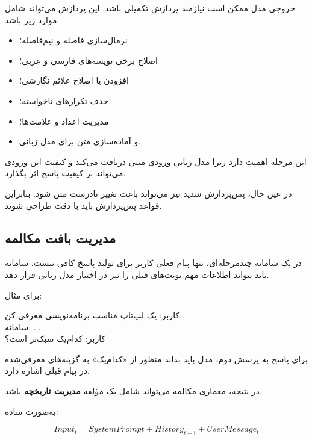 خروجی مدل  ممکن است نیازمند پردازش تکمیلی باشد.
این پردازش می‌تواند شامل موارد زیر باشد:

\begin{itemize}

    \item نرمال‌سازی فاصله و نیم‌فاصله؛

    \item اصلاح برخی نویسه‌های فارسی و عربی؛

    \item افزودن یا اصلاح علائم نگارشی؛

    \item حذف تکرارهای ناخواسته؛

    \item مدیریت اعداد و علامت‌ها؛

    \item و آماده‌سازی متن برای مدل زبانی.

\end{itemize}

این مرحله اهمیت دارد زیرا مدل زبانی ورودی متنی دریافت می‌کند و
کیفیت این ورودی می‌تواند بر کیفیت پاسخ اثر بگذارد.

در عین حال، پس‌پردازش شدید نیز می‌تواند باعث تغییر نادرست متن
شود.
بنابراین قواعد پس‌پردازش باید با دقت طراحی شوند.


\subsection{مدیریت بافت مکالمه}

در یک سامانه چندمرحله‌ای، تنها پیام فعلی کاربر برای تولید پاسخ
کافی نیست.
سامانه باید بتواند اطلاعات مهم نوبت‌های قبلی را نیز در اختیار
مدل زبانی قرار دهد.

برای مثال:

\begin{center}
کاربر: یک لپ‌تاپ مناسب برنامه‌نویسی معرفی کن. \\
سامانه: ... \\
کاربر: کدام‌یک سبک‌تر است؟
\end{center}

برای پاسخ به پرسش دوم، مدل باید بداند منظور از «کدام‌یک» به
گزینه‌های معرفی‌شده در پیام قبلی اشاره دارد.

در نتیجه، معماری مکالمه می‌تواند شامل یک مؤلفه
\textbf{مدیریت تاریخچه}
باشد.

به‌صورت ساده:

\begin{equation}
Input_t
=
SystemPrompt
+
History_{t-1}
+
UserMessage_t
\end{equation}

